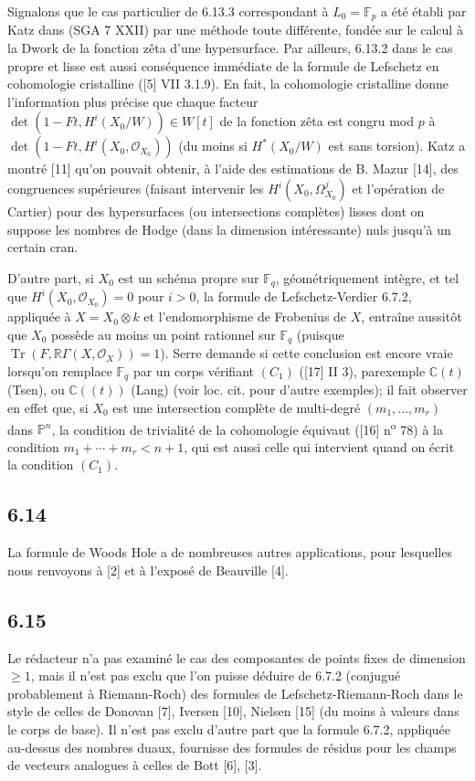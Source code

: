 \documentclass[11pt]{article}
\newcommand{\R}{\mathbb{R}}\newcommand{\RHomCore}{\mathbb{R}\mathrm{Hom}}
\providecommand{\OO}{\mathcal{O}}
\providecommand{\R}{\mathrm R}
\begin{document}
Signalons que le cas particulier de 6.13.3 correspondant à $L_0=\mathbb F_p$ a été établi par Katz dans (SGA 7 XXII) par une méthode toute différente, fondée sur le calcul à la Dwork de la fonction zêta d'une hypersurface. Par ailleurs, 6.13.2 dans le cas propre et lisse est aussi conséquence immédiate de la formule de Lefschetz en cohomologie cristalline ([5] VII 3.1.9). En fait, la cohomologie cristalline donne l'information plus précise que chaque facteur $\det(1-Ft,H^i(X_0/W))\in W[t]$ de la fonction zêta est congru mod $p$ à $\det(1-Ft,H^i(X_0,\OO_{X_0}))$ (du moins si $H^*(X_0/W)$ est sans torsion). Katz a montré [11] qu'on pouvait obtenir, à l'aide des estimations de B. Mazur [14], des congruences supérieures (faisant intervenir les $H^i(X_0,\Omega^j_{X_0})$ et l'opération de Cartier) pour des hypersurfaces (ou intersections complètes) lisses dont on suppose les nombres de Hodge (dans la dimension intéressante) nuls jusqu'à un certain cran.

D'autre part, si $X_0$ est un schéma propre sur $\mathbb F_q$, géométriquement intègre, et tel que $H^i(X_0,\OO_{X_0})=0$ pour $i>0$, la formule de Lefschetz-Verdier 6.7.2, appliquée à $X=X_0\otimes k$ et l'endomorphisme de Frobenius de $X$, entraîne aussitôt que $X_0$ possède au moins un point rationnel sur $\mathbb F_q$ (puisque $\operatorname{Tr}(F,\R\Gamma(X,\OO_X))=1$). Serre demande si cette conclusion est encore vraie lorsqu'on remplace $\mathbb F_q$ par un corps vérifiant $(C_1)$ ([17] II 3), parexemple $\mathbb C(t)$ (Tsen), ou $\mathbb C((t))$ (Lang) (voir loc. cit. pour d'autre exemples); il fait observer en effet que, si $X_0$ est une intersection complète de multi-degré $(m_1,\ldots,m_r)$ dans $\mathbb P^n$, la condition de trivialité de la cohomologie équivaut ([16] n\textsuperscript{o} 78) à la condition $m_1+\cdots+m_r<n+1$, qui est aussi celle qui intervient quand on écrit la condition $(C_1)$.

\subsection*{6.14}
La
formule de Woods Hole a de nombreuses autres applications, pour lesquelles nous renvoyons à [2] et à l'exposé de Beauville [4].


\subsection*{6.15}

Le rédacteur n'a pas examiné le cas des composantes de points fixes de dimension $\geq1$, mais il n'est pas exclu que l'on puisse déduire de 6.7.2 (conjugué probablement à Riemann-Roch) des formules de Lefschetz-Riemann-Roch dans le style de celles de Donovan [7], Iversen [10], Nielsen [15] (du moins à valeurs dans le corps de base). Il n'est pas exclu d'autre part que la formule 6.7.2, appliquée au-dessus des nombres duaux, fournisse des formules de résidus pour les champs de vecteurs analogues à celles de Bott [6], [3].
\end{document}
